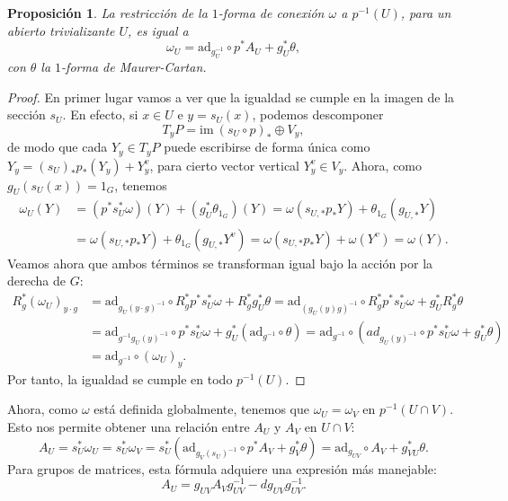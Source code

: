 \documentclass[12pt,a4paper]{article}
\newtheorem{prop}[thm]{Proposición}
\theoremstyle{definition} \newtheorem{defn}[thm]{Definición}
\theoremstyle{definition} \newtheorem{ejemplo}[thm]{Ejemplo}
\theoremstyle{definition} \newtheorem{ejercicio}[thm]{Ejercicio}
\theoremstyle{remark} \newtheorem*{obs}{Observación}
\def\ad{\mathrm{ad}}
\def\im{\mathrm{im}\ }
\begin{document}
	\begin{prop}
	  La restricción de la $1$-forma de conexión $\omega$ a $p^{-1}(U)$, para un abierto trivializante $U$, es igual a
	  \begin{equation*}
	    \omega_U=\ad_{g_U^{-1}}\circ p^*A_U+ g_U^*\theta,
	  \end{equation*}
	  con $\theta$ la $1$-forma de Maurer-Cartan.
	\end{prop}
	\begin{proof}
	  En primer lugar vamos a ver que la igualdad se cumple en la imagen de la sección $s_U$. En efecto, si $x\in U$ e $y=s_U(x)$, podemos descomponer
	  \begin{equation*}
	    T_yP=\im(s_U\circ p)_* \oplus V_y,
	  \end{equation*}
	  de modo que cada $Y_y\in T_yP$ puede escribirse de forma única como $Y_y=(s_U)_*p_*(Y_y)+Y_y^v$, para cierto vector vertical $Y_y^v\in V_y$. Ahora, como $g_U(s_U(x))=1_G$, tenemos
	  \begin{align*}
	    \omega_U(Y)&=(p^*s_U^*\omega)(Y)+(g_U^*\theta_{1_G})(Y)=\omega(s_{U,*}p_* Y) + \theta_{1_G}(g_{U,*}Y)\\ &=\omega(s_{U,*}p_* Y) + \theta_{1_G}(g_{U,*}Y^v)=\omega(s_{U,*}p_* Y) + \omega(Y^v)=\omega(Y).
	  \end{align*}
	  Veamos ahora que ambos términos se transforman igual bajo la acción por la derecha de $G$:
	  \begin{align*}
	    R_g^*(\omega_U)_{y\cdot g}&=\ad_{g_U (y\cdot g)^{-1}}\circ R_g^*p^*s_U^*\omega+R_g^*g_U^*\theta=\ad_{(g_U (y)g)^{-1}}\circ R_g^*p^*s_U^*\omega+g_U^*R_g^*\theta\\&=\ad_{g^{-1}g_U (y)^{-1}}\circ p^*s_U^*\omega+g_U^*(\ad_{g^{-1}}\circ\theta)=\ad_{g^{-1}}\circ(ad_{g_U(y)^{-1}}\circ p^*s_U^*\omega+g_U^*\theta)\\&=\ad_{g^{-1}}\circ (\omega_U)_y.
	  \end{align*}
	  Por tanto, la igualdad se cumple en todo $p^{-1}(U)$.
	\end{proof}
	Ahora, como $\omega$ está definida globalmente, tenemos que $\omega_U=\omega_V$ en $p^{-1}(U\cap V)$. Esto nos permite obtener una relación entre $A_U$ y $A_V$ en $U\cap V$:
	\begin{equation*}
	  A_U=s_U^*\omega_U=s_U^*\omega_V=s_U^*(\ad_{g_V(s_U)^{-1}}\circ p^* A_V + g_V^*\theta)= \ad_{g_{UV}}\circ A_V + g_{VU}^*\theta.
	\end{equation*}
	Para grupos de matrices, esta fórmula adquiere una expresión más manejable:
	\begin{equation*}
	  A_U=g_{UV}A_Vg_{UV}^{-1} - dg_{UV} g_{UV}^{-1}.
	\end{equation*}
\end{document}
